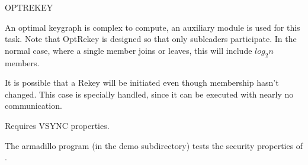 \begin{Layer}{OPTREKEY}
\begin{Protocol}
An optimal keygraph is complex to compute, an auxiliary module is used
for this task. Note that OptRekey is designed so that only
subleaders participate. In the normal case, where a single member
joins or leaves, this will include $log_2n$ members.

It is possible that a Rekey will be initiated even though
membership hasn't changed. This case is specially handled, since it can
be executed with nearly no communication.
\end{Protocol}

\begin{Properties}
\item Requires VSYNC properties.
\end{Properties}

\begin{Sources}
\end{Sources}

\begin{GenEvent}
\end{GenEvent}

\begin{Testing}
\item 
The armadillo program (in the demo subdirectory) tests the security properties
of \ensemble.
\end{Testing}

\end{Layer}



